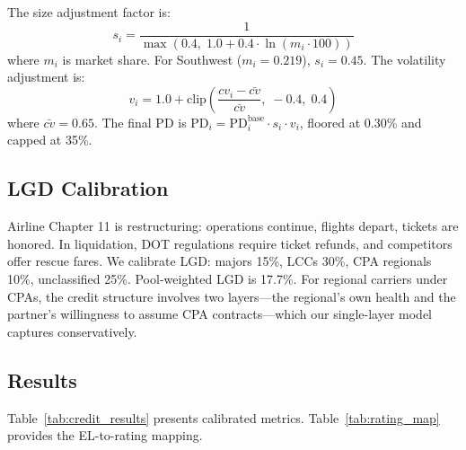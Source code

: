 \documentclass[12pt,a4paper]{article}
\begin{document}
The size adjustment factor is:
\begin{equation}
s_i = \frac{1}{\max(0.4, \; 1.0 + 0.4 \cdot \ln(m_i \cdot 100))}
\label{eq:size_adj}
\end{equation}
where $m_i$ is market share. For Southwest ($m_i = 0.219$), $s_i = 0.45$. The volatility adjustment is:
\begin{equation}
v_i = 1.0 + \text{clip}\left( \frac{cv_i - \bar{cv}}{\bar{cv}}, \; -0.4, \; 0.4 \right)
\label{eq:cv_adj}
\end{equation}
where $\bar{cv} = 0.65$. The final PD is $\text{PD}_i = \text{PD}_i^{\text{base}} \cdot s_i \cdot v_i$, floored at 0.30\% and capped at 35\%.

\subsection{LGD Calibration}

Airline Chapter 11 is restructuring: operations continue, flights depart, tickets are honored. In liquidation, DOT regulations require ticket refunds, and competitors offer rescue fares. We calibrate LGD: majors 15\%, LCCs 30\%, CPA regionals 10\%, unclassified 25\%. Pool-weighted LGD is 17.7\%. For regional carriers under CPAs, the credit structure involves two layers---the regional's own health and the partner's willingness to assume CPA contracts---which our single-layer model captures conservatively.

\subsection{Results}

Table~\ref{tab:credit_results} presents calibrated metrics. Table~\ref{tab:rating_map} provides the EL-to-rating mapping.
\end{document}
